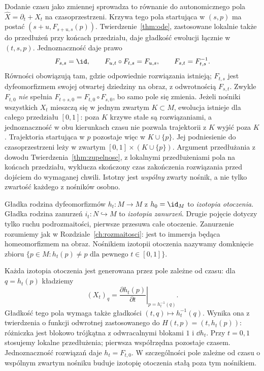 Dodanie czasu jako zmiennej sprowadza to równanie do autonomicznego
pola $\widehat X=\partial_t+X_t$ na czasoprzestrzeni.
Krzywa tego pola startująca w $(s,p)$ ma postać
$(s+u,F_{s+u,s}(p))$. Twierdzenie~\ref{thm:ode}, zastosowane
lokalnie także do przedłużeń przy końcach przedziału, daje
gładkość ewolucji łącznie w $(t,s,p)$. Jednoznaczność daje prawo
\begin{equation}\label{eq:ewolucja}
 F_{s,s}=\id,\qquad F_{u,t}\circ F_{t,s}=F_{u,s},
 \qquad F_{s,t}=F_{t,s}^{-1}.
\end{equation}
Równości obowiązują tam, gdzie odpowiednie rozwiązania istnieją;
$F_{t,s}$ jest dyfeomorfizmem swojej otwartej dziedziny na obraz,
z odwrotnością $F_{s,t}$.
Zwykle $F_{t,0}$ \emph{nie} spełnia
$F_{t+s,0}=F_{t,0}\circ F_{s,0}$, bo samo pole się zmienia.
Jeżeli nośniki wszystkich $X_t$ mieszczą się w jednym zwartym
$K\subset M$, ewolucja istnieje dla całego przedziału $[0,1]$:
poza $K$ krzywe stałe są rozwiązaniami, a jednoznaczność
w obu kierunkach czasu nie pozwala trajektorii z $K$ wyjść
poza $K$. Trajektoria startująca w $p$ pozostaje więc w
$K\cup\{p\}$. Jej podniesienie do czasoprzestrzeni leży
w zwartym $[0,1]\times(K\cup\{p\})$. Argument przedłużania
z dowodu Twierdzenia~\ref{thm:zupelnosc}, z lokalnymi przedłużeniami
pola na końcach przedziału, wyklucza skończony czas zakończenia
rozwiązania przed dojściem do wymaganej chwili. Istotny jest
\emph{wspólny} zwarty nośnik, a nie tylko zwartość każdego z nośników osobno.

\begin{definicja}
Gładka rodzina dyfeomorfizmów $h_t\colon M\to M$ z
$h_0=\id_M$ to \emph{izotopia otoczenia}.
Gładka rodzina zanurzeń $i_t\colon N\hookrightarrow M$ to
\emph{izotopia zanurzeń}. Drugie pojęcie dotyczy tylko ruchu
podrozmaitości, pierwsze przesuwa całe otoczenie.
Zanurzenie rozumiemy jak w Rozdziale~\ref{ch:rozmaitosci}:
jest to immersja będąca homeomorfizmem na obraz.
Nośnikiem izotopii otoczenia nazywamy domknięcie zbioru
$\{p\in M:h_t(p)\ne p\text{ dla pewnego }t\in[0,1]\}$.
\end{definicja}

Każda izotopia otoczenia jest generowana przez pole zależne od
czasu: dla $q=h_t(p)$ kładziemy
\begin{equation}\label{eq:generator-izotopii}
 (X_t)_q=\left.\frac{\partial h_t(p)}{\partial t}
 \right|_{p=h_t^{-1}(q)}.
\end{equation}
Gładkość tego pola wymaga także gładkości $(t,q)\mapsto h_t^{-1}(q)$.
Wynika ona z twierdzenia o funkcji odwrotnej zastosowanego do
$H(t,p)=(t,h_t(p))$: różniczka jest blokowo trójkątna z
odwracalnymi blokami $1$ i $\dd h_t$. Przy $t=0,1$ stosujemy
lokalne przedłużenia; pierwsza współrzędna pozostaje czasem.
Jednoznaczność rozwiązań daje $h_t=F_{t,0}$.
W szczególności pole zależne od czasu
o wspólnym zwartym nośniku buduje izotopię otoczenia
stałą poza tym nośnikiem.

